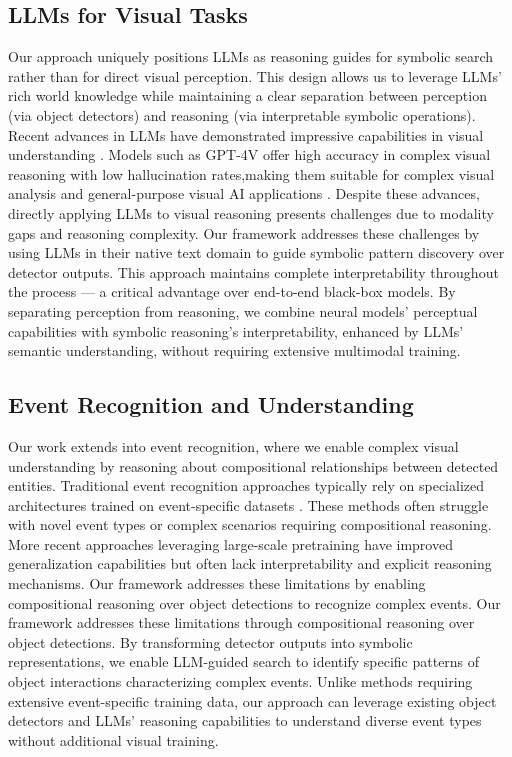 \subsection{LLMs for Visual Tasks}
Our approach uniquely positions LLMs as reasoning guides for symbolic search rather than for direct visual perception. This design allows us to leverage LLMs' rich world knowledge while maintaining a clear separation between perception (via object detectors) and reasoning (via interpretable symbolic operations).
Recent advances in LLMs have demonstrated impressive capabilities in visual understanding \cite{radford2021learning,liu2021swin,han2023llms,sun2023eva,zhang2022dino,liang2023open,zou2024segment,shen2024aligning,cheng2024yolo}. Models such as GPT-4V offer high accuracy in complex visual reasoning with low hallucination rates,making them suitable for complex visual analysis and general-purpose visual AI applications \cite{yang2023dawn}. Despite these advances, directly applying LLMs to visual reasoning presents challenges due to modality gaps and reasoning complexity.
Our framework addresses these challenges by using LLMs in their native text domain to guide symbolic pattern discovery over detector outputs. This approach maintains complete interpretability throughout the process --- a critical advantage over end-to-end black-box models. By separating perception from reasoning, we combine neural models' perceptual capabilities with symbolic reasoning's interpretability, enhanced by LLMs' semantic understanding, without requiring extensive multimodal training.
%
\subsection{Event Recognition and Understanding}
Our work extends into event recognition, where we enable complex visual understanding by reasoning about compositional relationships between detected entities.
Traditional event recognition approaches typically rely on specialized architectures trained on event-specific datasets \cite{lin2021complex,sakaino2023deepunseen,merlo2023automatic,fan2023flexible}. These methods often struggle with novel event types or complex scenarios requiring compositional reasoning. More recent approaches leveraging large-scale pretraining have improved generalization capabilities but often lack interpretability and explicit reasoning mechanisms.
Our framework addresses these limitations by enabling compositional reasoning over object detections to recognize complex events. Our framework addresses these limitations through compositional reasoning over object detections. By transforming detector outputs into symbolic representations, we enable LLM-guided search to identify specific patterns of object interactions characterizing complex events.   Unlike methods requiring extensive event-specific training data, our approach can leverage existing object detectors and LLMs' reasoning capabilities to understand diverse event types without additional visual training.